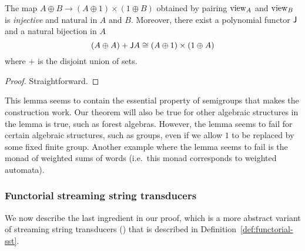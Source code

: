 \begin{lemma}
\label{lem:views}
The map $A \oplus B \to (A \oplus 1) \times (1 \oplus B)$ obtained by pairing $\mathrm{view}_A$ and $\mathrm{view}_B$ is \emph{injective} and natural in $A$ and $B$. Moreover, there exist a polynomial functor $\mathsf J$ and a natural bijection in $A$
\[ (A \oplus A) + \mathsf J A \cong (A \oplus 1) \times (1 \oplus A) \]
where $+$ is the disjoint union of sets.
\end{lemma}
\begin{proof}
    Straightforward.
\end{proof}

This lemma seems to contain the essential property of semigroups that makes the construction work. Our theorem will also be true for other algebraic structures in the lemma is true, such as forest algebras. However, the lemma seems to fail for certain algebraic structures, such as groups, even if we allow $1$ to be replaced by some fixed finite group. Another example where the lemma seems to fail is the monad of weighted sums of words (i.e.~this monad corresponds to weighted automata).

\subsubsection{Functorial streaming string transducers}
\label{sec:functorial-sst}
We now describe the last ingredient in our proof, which is a more abstract variant  of streaming string transducers (\sst) that is described in Definition~\ref{def:functorial-sst}. 

